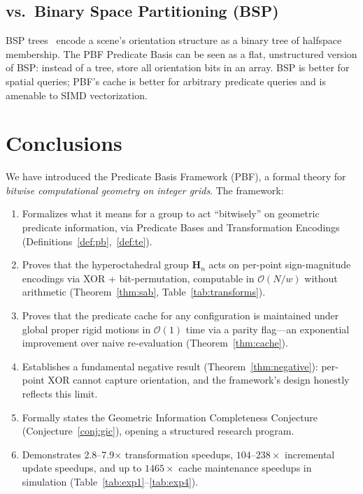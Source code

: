 \documentclass[11pt,letterpaper]{article}
\newcommand{\Hn}{\mathbf{H}_n}
\newcommand{\cO}{\mathcal{O}}
\newcommand{\wt}{w}       %
\begin{document}
\subsection{vs.\ Binary Space Partitioning (BSP)}

BSP trees~\cite{Fuchs80} encode a scene's orientation structure as a binary tree of
halfspace membership.  The PBF Predicate Basis can be seen as a flat, unstructured
version of BSP: instead of a tree, store all orientation bits in an array.  BSP is
better for spatial queries; PBF's cache is better for arbitrary predicate queries and
is amenable to SIMD vectorization.

\section{Conclusions}\label{sec:conclusions}

We have introduced the Predicate Basis Framework (PBF), a formal theory for
\emph{bitwise computational geometry on integer grids}.  The framework:

\begin{enumerate}
\item Formalizes what it means for a group to act ``bitwisely'' on geometric predicate
  information, via Predicate Bases and Transformation Encodings (Definitions~\ref{def:pb},~\ref{def:te}).

\item Proves that the hyperoctahedral group $\Hn$ acts on per-point sign-magnitude
  encodings via XOR + bit-permutation, computable in $\cO(N/\wt)$ without arithmetic
  (Theorem~\ref{thm:sab}, Table~\ref{tab:transforms}).

\item Proves that the predicate cache for any configuration is maintained under global
  proper rigid motions in $\cO(1)$ time via a parity flag---an exponential improvement
  over naive re-evaluation (Theorem~\ref{thm:cache}).

\item Establishes a fundamental negative result (Theorem~\ref{thm:negative}): per-point
  XOR cannot capture orientation, and the framework's design honestly reflects this limit.

\item Formally states the Geometric Information Completeness Conjecture
  (Conjecture~\ref{conj:gic}), opening a structured research program.

\item Demonstrates 2.8--7.9$\times$ transformation speedups, $104$--$238\times$
  incremental update speedups, and up to $1465\times$ cache maintenance speedups in
  simulation (Table~\ref{tab:exp1}--\ref{tab:exp4}).
\end{enumerate}
\end{document}
